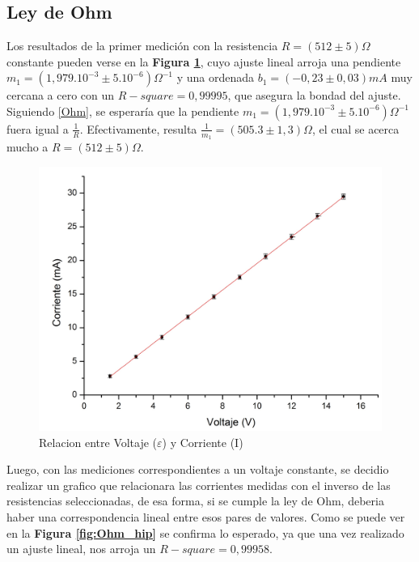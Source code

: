 \documentclass[11pt,a4paper]{article}
\begin{document}
\subsection{Ley de Ohm}

Los resultados de la primer medición con la resistencia $R = (512 \pm 5)\Omega$ constante pueden verse en la \textbf{Figura \ref{fig:Ohm_lin}}, cuyo ajuste lineal arroja una pendiente $m_1 = (1,979.10^{-3} \pm 5.10^{-6})\Omega^{-1}$ y una ordenada $b_1 = (-0,23\pm 0,03)mA$ muy cercana a cero con un $R-square = 0,99995$, que asegura la bondad del ajuste. Siguiendo \eqref{Ohm}, se esperaría que la pendiente $m_1 = (1,979.10^{-3} \pm 5.10^{-6})\Omega^{-1}$ fuera igual a $\frac{1}{R}$. Efectivamente, resulta $\frac{1}{m_1} = (505.3 \pm 1,3)\Omega$, el cual se acerca mucho a $R = (512 \pm 5)\Omega$.

\begin{figure}[h]
  \centering
  \includegraphics[scale=0.4]{Corriente_vs_Voltaje}
  \caption{Relacion entre Voltaje ($\varepsilon$) y Corriente (I)}
  \label{fig:Ohm_lin}
\end{figure}

Luego, con las mediciones correspondientes a un voltaje constante, se decidio realizar un grafico que relacionara las corrientes medidas con el inverso de las resistencias seleccionadas, de esa forma, si se cumple la ley de Ohm, deberia haber una correspondencia lineal entre esos pares de valores. Como se puede ver en la \textbf{Figura \ref{fig:Ohm_hip}} se confirma lo esperado, ya que una vez realizado un ajuste lineal, nos arroja un $R-square = 0,99958$.
\end{document}
